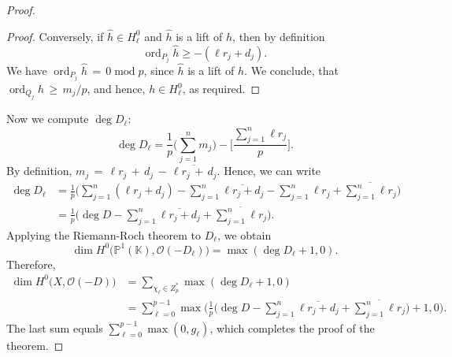 \documentclass[10pt,a4paper]{amsart}
\DeclareMathOperator{\modOp}{mod}
\DeclareMathOperator{\ord}{ord}
\begin{document}
\begin{proof}
\begin{proof}
Conversely, if $\widehat{h} \in H_{\ell}^{0}$ and $\widehat{h}$ is a lift of $h$, 
then by definition $$\ord_{P_j} \widehat{h} \geq - (\ell r_j + d_j).$$ 
We  have  $\ord_{P_j} \widehat{h}  \,{=}\,0\modOp p$,
since $\widehat{h}$ is a lift of $h$. 
We conclude, that $\ord_{Q_j} h \,{\geq}\, m_j/p$, 
and hence, $h\in H_{\ell}^{0}$, as required. 
\end{proof}
Now we compute $\deg D_{\ell}$: 
\begin{equation}
\deg D_{\ell} =\frac{1}{p}\bigg(\sum_{j=1}^{n} m_j \bigg)
-\bigg[\frac{\sum_{j=1}^n \ell r_j}{p}\bigg]. 
\end{equation}
By definition, $m_j\,{=}\, \ell r_j \,{+}\, d_j \,{-}\,\overline{\ell r_j \,{+}\, d_j}$. Hence, we can write
\begin{equation}
\begin{split}
\deg D_{\ell} &= \frac{1}{p}\bigg(\sum_{j=1}^n (\ell r_j + d_j)
-\sum_{j=1}^n \overline{\ell r_j + d_j}-\sum_{j=1}^n \ell r_j+\overline{\sum_{j=1}^n \ell r_j}\bigg) \\
&=\frac{1}{p}\bigg(\deg D -\sum_{j=1}^n\overline{\ell r_j + d_j}+\overline{\sum_{j=1}^n \ell r_j}\bigg).
\end{split}
\end{equation}
Applying the Riemann-Roch theorem to $D_{\ell}$, we obtain
$$\dim H^0 \big(\mathbb{P}^{1}(\mathbb{K}),\mathcal{O}(-D_{\ell}) \big)
= \max (\deg D_{\ell} +1,0). $$ 
Therefore,
\begin{equation}
\begin{split}
\dim H^0 \big(X,\mathcal O(-D)\big) &= \sum_{\chi_{\ell} \in Z_p^{*}} \max(\deg D_{\ell} +1,0)\\
&=\sum_{\ell=0}^{p-1} \max\bigg(\frac{1}{p}\bigg(\deg D - \sum_{j=1}^n \overline{\ell r_j + d_j}
+\overline{\sum_{j=1}^n \ell r_j}\bigg)+1,0\bigg).
\end{split}
\end{equation}
The last sum equals 
$\sum_{\ell=0}^{p-1} \max(0,g_{\ell})$, which completes the proof of the theorem. 
\end{proof}
\end{document}
